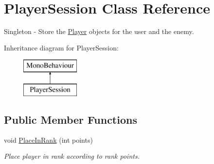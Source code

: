 \hypertarget{class_player_session}{}\section{Player\+Session Class Reference}
\label{class_player_session}


Singleton -\/ Store the \mbox{\hyperlink{class_player}{Player}} objects for the user and the enemy.  


Inheritance diagram for Player\+Session\+:\begin{figure}[H]
\begin{center}
\leavevmode
\includegraphics[height=2.000000cm]{class_player_session}
\end{center}
\end{figure}
\subsection*{Public Member Functions}
\begin{DoxyCompactItemize}
\item 
void \mbox{\hyperlink{class_player_session_aeb4aa3bf4eaaa1f444ab5d9e06144898}{Place\+In\+Rank}} (int points)
\begin{DoxyCompactList}\small\item\em Place player in rank according to rank points. \end{DoxyCompactList}\end{DoxyCompactItemize}
